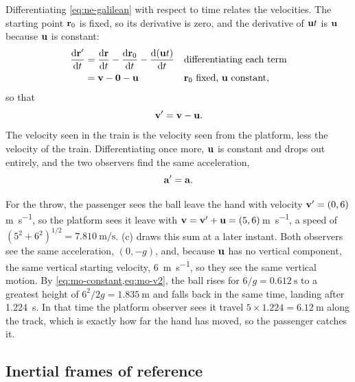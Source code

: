 Differentiating \cref{eq:ne-galilean} with respect to time relates the
velocities. The starting point $\bm{\mathrm{r}}_0$ is fixed, so its derivative is
zero, and the derivative of $\bm{\mathrm{u}}t$ is $\bm{\mathrm{u}}$ because $\bm{\mathrm{u}}$ is
constant:
\begin{align*}
   \frac{\mathrm{d}\bm{\mathrm{r}}'}{\mathrm{d} t}
   &= \frac{\mathrm{d}\bm{\mathrm{r}}}{\mathrm{d} t} - \frac{\mathrm{d}\bm{\mathrm{r}}_0}{\mathrm{d} t}
      - \frac{\mathrm{d}(\bm{\mathrm{u}}t)}{\mathrm{d} t}
      && \text{differentiating each term}\\
   &= \bm{\mathrm{v}} - \bm{\mathrm{0}} - \bm{\mathrm{u}}
      && \text{$\bm{\mathrm{r}}_0$ fixed, $\bm{\mathrm{u}}$ constant,}
\end{align*}
so that
\begin{equation}
   \bm{\mathrm{v}}' = \bm{\mathrm{v}} - \bm{\mathrm{u}} .
   \label{eq:ne-velocity-frames}
\end{equation}
The velocity seen in the train is the velocity seen from the platform,
less the velocity of the train. Differentiating once more, $\bm{\mathrm{u}}$ is
constant and drops out entirely, and the two observers find the same
acceleration,
\begin{equation*}
   \bm{\mathrm{a}}' = \bm{\mathrm{a}} .
\end{equation*}

For the throw, the passenger sees the ball leave the hand with velocity
$\bm{\mathrm{v}}' = (0, 6)$\,\si{\metre\per\second}, so the platform sees it leave
with $\bm{\mathrm{v}} = \bm{\mathrm{v}}' + \bm{\mathrm{u}} = (5, 6)$\,\si{\metre\per\second}, a
speed of $(5^2 + 6^2)^{1/2} = \SI{7.810}{\metre\per\second}$.
(c) draws this sum at a later instant. Both observers
see the same acceleration, $(0, -g)$, and, because $\bm{\mathrm{u}}$ has no
vertical component, the same vertical starting velocity,
\SI{6}{\metre\per\second}, so they see the same vertical motion. By
\cref{eq:mo-constant,eq:mo-v2}, the ball rises for $6/g =
\SI{0.612}{\second}$ to a greatest height of $6^2/2g = \SI{1.835}{\metre}$
and falls back in the same time, landing after \SI{1.224}{\second}. In
that time the platform observer sees it travel $5\times1.224 =
\SI{6.12}{\metre}$ along the track, which is exactly how far the hand has
moved, so the passenger catches it.

\subsection*{Inertial frames of reference}

